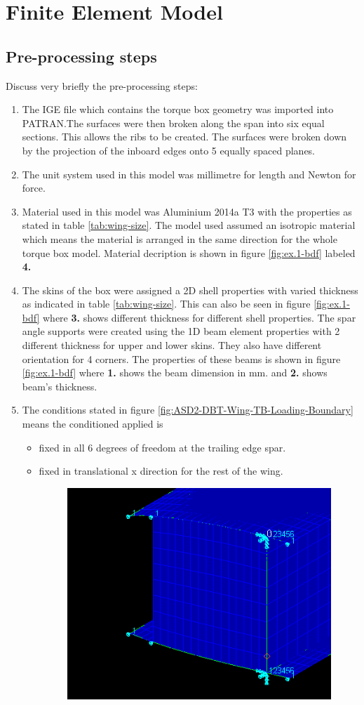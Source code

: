 \documentclass[11pt,a4paper,oneside]{memoir}
\begin{document}
%
\chapter{Finite Element Model}\label{chap:fe-model}
\section{Pre-processing steps}Discuss very briefly the pre-processing steps:
\begin{enumerate}
    \item The IGE file which contains the torque box geometry was imported into PATRAN.The surfaces were then broken along the span into six equal sections. This allows the ribs to be created. The surfaces were broken down by the projection of the inboard edges onto 5 equally spaced planes.
    \item The unit system used in this model was millimetre for length and Newton for force.
    \item Material used in this model was Aluminium 2014a T3 with the properties as stated in table \ref{tab:wing-size}. The model used assumed an isotropic material which means the material is arranged in the same direction for the whole torque box model. Material decription is shown in figure \ref{fig:ex.1-bdf} labeled \textbf{4.}
    \item The skins of the box were assigned a 2D shell properties with varied thickness as indicated in table \ref{tab:wing-size}. This can also be seen in figure \ref{fig:ex.1-bdf} where \textbf{3.} shows different thickness for different shell properties. The spar angle supports were created using the 1D beam element properties with 2 different thickness for upper and lower skins. They also have different orientation for 4 corners. The properties of these beams is shown in figure \ref{fig:ex.1-bdf} where \textbf{1.} shows the beam dimension in mm. and \textbf{2.} shows beam's thickness.
    \item The conditions stated in figure \ref{fig:ASD2-DBT-Wing-TB-Loading-Boundary} means the conditioned applied is 
    \begin{itemize}
        \item fixed in all 6 degrees of freedom at the trailing edge spar.
        \item fixed in translational x direction for the rest of the wing.
        \begin{figure}[h]
            \centering
            \includegraphics[width = .5\textwidth]{figures/boundary-condition.png}

\end{figure}
\end{itemize}
\end{enumerate}
\end{document}
